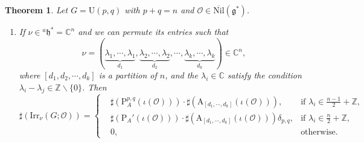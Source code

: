 \documentclass[12pt, a4paper]{amsart}
\numberwithin{equation}{section}
\newtheorem{thm}{Theorem}[section]
\newcommand{\BC}{{\mathbb {C}}}
\newcommand{\BZ}{{\mathbb {Z}}}
\newcommand{\CO}{{\mathcal {O}}}
\newcommand{\fg}{\mathfrak{g}}
\newcommand{\fh}{\mathfrak{h}}
\newcommand{\U}{{\mathrm{U}}}
\newcommand{\Irr}{{\mathrm{Irr}}}
\newcommand{\Nil}{{\mathrm{Nil}}}
\renewcommand{\bar}{\overline}
\begin{document}
\begin{thm}\label{U}
    Let $G = \U(p,q)$ with $p + q = n$ and $\CO \in \bar{\Nil}(\fg^*)$.
    \begin{enumerate}
        \item If $\nu \in {^a\fh^*} = \BC^n$ and we can permute its entries such that 
        \[ 
        \nu =  (\underbrace{\lambda_1, \cdots, \lambda_1}_{d_1}, \underbrace{\lambda_2, \cdots, \lambda_2}_{d_2}, \cdots, \underbrace{\lambda_k, \cdots, \lambda_k}_{d_k} ) \in \BC^n, 
        \]
        where $[d_1, d_2, \cdots, d_k]$ is a partition of $n$, and the $\lambda_i \in \BC$ satisfy the condition $\lambda_i - \lambda_j \in \BZ \backslash \{0\}$. Then
        \begin{equation}
            \sharp(\Irr_{\nu}(G;\CO)) = \left\{
            \begin{aligned}
                &\sharp(\mathrm{P}_{A}^{p,q}(\iota(\CO))) \cdot \sharp(\mathrm{A}_{[d_1,\cdots,d_{k}]}(\iota(\CO))), & \textrm{if $\lambda_i \in \frac{n-1}{2} + \BZ$}, \\ 
                &\sharp(\mathrm{P}_{A}'(\iota(\CO)))\cdot\sharp(\mathrm{A}_{[d_1,\cdots,d_k]}(\iota(\CO)))\delta_{p,q}, & \textrm{if $\lambda_i \in \frac{n}{2} + \BZ$},\\
                &0, & \textrm{otherwise}.
            \end{aligned}
            \right.
        \end{equation}


\end{enumerate}
\end{thm}
\end{document}
